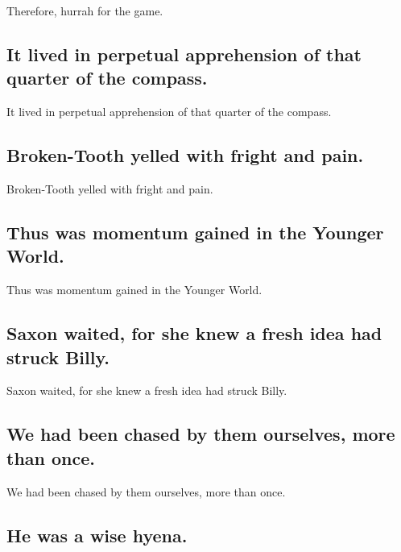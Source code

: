 \documentclass[]{article}
\begin{document}
Therefore, hurrah for the game.

\hypertarget{it-lived-in-perpetual-apprehension-of-that-quarter-of-the-compass.}{%
\subsection{It lived in perpetual apprehension of that quarter of the
compass.}\label{it-lived-in-perpetual-apprehension-of-that-quarter-of-the-compass.}}

It lived in perpetual apprehension of that quarter of the compass.

\hypertarget{broken-tooth-yelled-with-fright-and-pain.}{%
\subsection{Broken-Tooth yelled with fright and
pain.}\label{broken-tooth-yelled-with-fright-and-pain.}}

Broken-Tooth yelled with fright and pain.

\hypertarget{thus-was-momentum-gained-in-the-younger-world.}{%
\subsection{Thus was momentum gained in the Younger
World.}\label{thus-was-momentum-gained-in-the-younger-world.}}

Thus was momentum gained in the Younger World.

\hypertarget{saxon-waited-for-she-knew-a-fresh-idea-had-struck-billy.}{%
\subsection{Saxon waited, for she knew a fresh idea had struck
Billy.}\label{saxon-waited-for-she-knew-a-fresh-idea-had-struck-billy.}}

Saxon waited, for she knew a fresh idea had struck Billy.

\hypertarget{we-had-been-chased-by-them-ourselves-more-than-once.}{%
\subsection{We had been chased by them ourselves, more than
once.}\label{we-had-been-chased-by-them-ourselves-more-than-once.}}

We had been chased by them ourselves, more than once.

\hypertarget{he-was-a-wise-hyena.}{%
\subsection{He was a wise hyena.}\label{he-was-a-wise-hyena.}}
\end{document}
